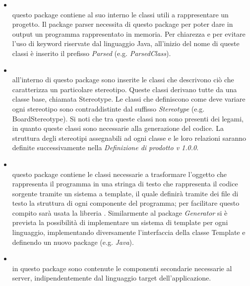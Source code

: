 \begin{itemize}
\begin{itemize}
\item \hyperref[\nogloxy{SWEDesigner::Server::Project}]{}\\
questo package contiene al suo interno le classi utili a rappresentare un progetto. Il package parser necessita di questo package per poter dare in output un programma rappresentato in memoria. Per chiarezza e per evitare l'uso di keyword riservate dal linguaggio Java, all'inizio del nome di queste classi è inserito il prefisso \emph{Parsed} (e.g. \emph{ParsedClass}).
\item \hyperref[\nogloxy{SWEDesigner::Server::Stereotype}]{}\\
all'interno di questo package sono inserite le classi che descrivono ciò che caratterizza un particolare stereotipo. Queste classi derivano tutte da una classe base, chiamata Stereotype. Le classi che definiscono come deve variare ogni stereotipo sono contraddistinte dal suffisso \emph{Stereotype} (e.g. BoardStereotype). Si noti che tra queste classi non sono presenti dei legami, in quanto queste classi sono necessarie alla generazione del codice. La struttura degli stereotipi assegnabili ad ogni classe e le loro relazioni saranno definite successivamente nella \emph{Definizione di prodotto v 1.0.0}.
\item \hyperref[\nogloxy{SWEDesigner::Server::Template}]{}\\
questo package contiene le classi necessarie a trasformare l'oggetto che rappresenta il programma in una stringa di testo che rappresenta il codice sorgente tramite un sistema a template, il quale definirà tramite dei file di testo la struttura di ogni componente del programma; per facilitare questo compito sarà usata la libreria \stringtemplate{}. Similarmente al package \emph{Generator} si è prevista la possibilità di implementare un sistema di template per ogni linguaggio, implementando diversamente l'interfaccia della classe Template e definendo un nuovo package (e.g. \emph{Java}).
\item \hyperref[\nogloxy{SWEDesigner::Server::Utility}]{}\\
in questo package sono contenute le componenti secondarie necessarie al server, indipendentemente dal linguaggio target dell'applicazione.
\end{itemize}
\end{itemize}

\subsection{}
\label{\nogloxy{SWEDesigner::Server::Compiler}}
